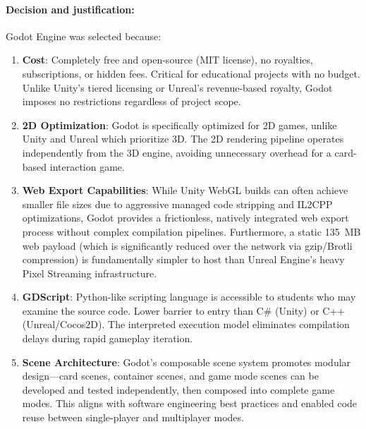 \paragraph*{Decision and justification:}

Godot Engine was selected because:

\begin{enumerate}
    \item \textbf{Cost}: Completely free and open-source (MIT license), no royalties, subscriptions, or hidden fees. Critical for educational projects with no budget. Unlike Unity's tiered licensing or Unreal's revenue-based royalty, Godot imposes no restrictions regardless of project scope.

    \item \textbf{2D Optimization}: Godot is specifically optimized for 2D games, unlike Unity and Unreal which prioritize 3D. The 2D rendering pipeline operates independently from the 3D engine, avoiding unnecessary overhead for a card-based interaction game.

    \item \textbf{Web Export Capabilities}: While Unity WebGL builds can often achieve smaller file sizes due to aggressive managed code stripping and IL2CPP optimizations, Godot provides a frictionless, natively integrated web export process without complex compilation pipelines. Furthermore, a static 135~MB web payload (which is significantly reduced over the network via gzip/Brotli compression) is fundamentally simpler to host than Unreal Engine's heavy Pixel Streaming infrastructure.

    \item \textbf{GDScript}: Python-like scripting language is accessible to students who may examine the source code. Lower barrier to entry than C\# (Unity) or C++ (Unreal/Cocos2D). The interpreted execution model eliminates compilation delays during rapid gameplay iteration.

    \item \textbf{Scene Architecture}: Godot's composable scene system promotes modular design---card scenes, container scenes, and game mode scenes can be developed and tested independently, then composed into complete game modes. This aligns with software engineering best practices and enabled code reuse between single-player and multiplayer modes.


\end{enumerate}
